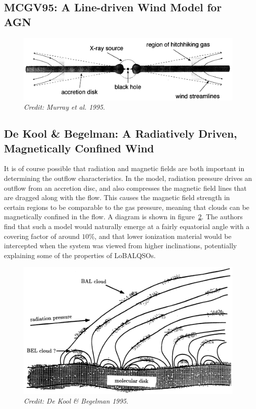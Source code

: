 \subsection{MCGV95: A Line-driven Wind Model for AGN}

\begin{figure}
\centering
\includegraphics[width=1.0\textwidth]{figures/02-outflows/MCGV95.png}
\caption
{
{\sl Credit: Murray et al. 1995}. 
} 
\label{fig:MCGV95}
\end{figure}




\subsection{De Kool \& Begelman: A Radiatively Driven, Magnetically Confined Wind}

It is of course possible that radiation and magnetic fields are both important
in determining the outflow characteristics. In the \cite{dekool1995} model, radiation
pressure drives an outflow from an accretion disc, and also compresses the magnetic
field lines that are dragged along with the flow. This causes the magnetic field
strength in certain regions to be comparable to the gas pressure, meaning that clouds
can be magnetically confined in the flow. A diagram is shown in figure~\ref{fig:dekool}.
The authors find that such a model would naturally emerge at a fairly equatorial
angle with a covering factor of around $10\%$, and that lower ionization material 
would be intercepted when the system was viewed from higher inclinations, potentially
explaining some of the properties of LoBALQSOs.

\begin{figure}
\centering
\includegraphics[width=1.0\textwidth]{figures/02-outflows/dekool.png}
\caption
{
{\sl Credit: De Kool \& Begelman 1995}. 
} 
\label{fig:dekool}
\end{figure}


